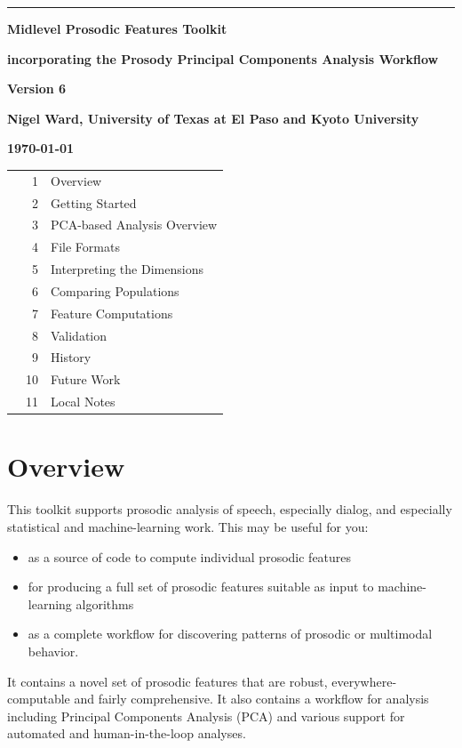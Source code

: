 \documentclass[11pt]{article}
\begin{document}
\noindent
\thispagestyle{empty}
\sloppy

\rule{1mm}{0mm}

\vspace{-17mm}
{\LARGE \bf Midlevel Prosodic Features Toolkit }

\smallskip
{\large \bf incorporating the  Prosody Principal Components Analysis Workflow}
\medskip


{\LARGE \bf Version 6}
\vspace{7mm}


{\bf Nigel Ward, University of Texas at El Paso and Kyoto University}

{\bf \today }

\vspace{-1ex}

\begin{tabular}{p{7cm}rl}
& 1 & Overview  \\
& 2 & Getting Started \\
& 3 & PCA-based Analysis Overview \\
& 4 & File Formats \\
& 5 & Interpreting the Dimensions \\
& 6 & Comparing Populations \\
& 7 & Feature Computations\\ 
& 8 & Validation \\
& 9 & History \\
& 10 & Future Work \\
& 11 & Local Notes
\end{tabular}

\vspace{-3.5ex}
\section{Overview} 

This toolkit supports prosodic analysis of speech, especially dialog,
and especially statistical and machine-learning work.
This may be useful for you:
\begin{itemize}\setlength{\itemsep}{0pt}\setlength{\parskip}{0pt}
\item as a source of code to compute individual
prosodic features 
\item for producing a full set of prosodic features
suitable as input to machine-learning algorithms 
\item as a complete
workflow for discovering patterns of prosodic or multimodal behavior.
\end{itemize}
It contains a novel set of prosodic features that are robust,
everywhere-computable and fairly comprehensive.  It also contains a
workflow for analysis including Principal Components Analysis (PCA)
and various support for automated and human-in-the-loop analyses.
\end{document}

